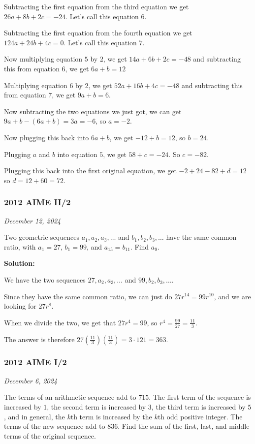 \documentclass[../mathproblems.tex]{subfiles}
\begin{document}
Subtracting the first equation from the third equation we get $26a+8b+2c=-24$. Let's call this equation $6$.

Subtracting the first equation from the fourth equation we get $124a+24b+4c=0$. Let's call this equation $7$.

Now multiplying equation $5$ by $2$, we get $14a+6b+2c=-48$ and subtracting this from equation $6$, we get $6a+b=12$

Multiplying equation $6$ by $2$, we get $52a+16b+4c=-48$ and subtracting this from equation $7$, we get $9a+b=6$.

Now subtracting the two equations we just got, we can get $9a+b-(6a+b) = 3a = -6$, so $a=-2$.

Now plugging this back into $6a+b$, we get $-12+b=12$, so $b=24$.

Plugging $a$ and $b$ into equation $5$, we get $58+c=-24$. So $c=-82$.

Plugging this back into the first original equation, we get $-2+24-82+d=12$ so $d=12+60=\boxed{72}$.

\noindent\hrulefill

\subsubsection*{2012 AIME II/2}
\textit{December 12, 2024}

Two geometric sequences $a_1, a_2, a_3, \ldots$ and $b_1, b_2, b_3, \ldots$ have the same common ratio, with $a_1 = 27$, $b_1=99$, and $a_{15}=b_{11}$. Find $a_9$. 

\textbf{Solution:}

We have the two sequences $27,a_2,a_3,\dots$ and $99,b_2,b_3,\dots$. 

Since they have the same common ratio, we can just do $27r^{14} = 99r^{10}$, and we are looking for $27r^8$. 

When we divide the two, we get that $27r^4 = 99$, so $r^4 = \frac{99}{27} = \frac{11}{3}$. 

The answer is therefore $27\left(\frac{11}{3}\right)\left(\frac{11}{3}\right) = 3\cdot 121 = \boxed{363}$.

\noindent\hrulefill

\subsubsection*{2012 AIME I/2}
\textit{December 6, 2024}

The terms of an arithmetic sequence add to $715$. The first term of the sequence is increased by $1$, the second term is increased by $3$, the third term is increased by $5$, and in general, the $k$th term is increased by the $k$th odd positive integer. The terms of the new sequence add to $836$. Find the sum of the first, last, and middle terms of the original sequence. 
\end{document}
